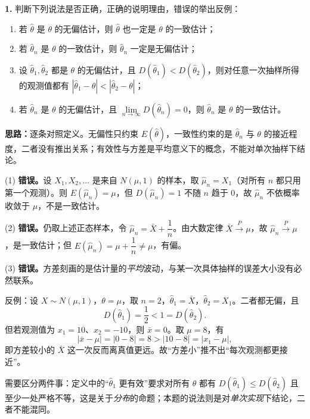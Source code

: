 \textbf{1.} 判断下列说法是否正确，正确的说明理由，错误的举出反例：
\begin{enumerate}[label=(\arabic*)]
    \item 若 $\widehat\theta$ 是 $\theta$ 的无偏估计，则 $\widehat\theta$ 也一定是 $\theta$ 的一致估计；
    \item 若 $\widehat\theta_n$ 是 $\theta$ 的一致估计，则 $\widehat\theta_n$ 一定是无偏估计；
    \item 设 $\widehat\theta_1,\widehat\theta_2$ 都是 $\theta$ 的无偏估计，且 $D(\widehat\theta_1)<D(\widehat\theta_2)$，则对任意一次抽样所得的观测值都有 $|\widehat\theta_1-\theta|<|\widehat\theta_2-\theta|$；
    \item 若 $\widehat\theta_n$ 是 $\theta$ 的无偏估计，且 $\lim\limits_{n\to\infty}D(\widehat\theta_n)=0$，则 $\widehat\theta_n$ 是 $\theta$ 的一致估计。
\end{enumerate}

\ifshowsolutions%
\textbf{思路：}逐条对照定义。无偏性只约束 $E(\widehat\theta)$，一致性约束的是 $\widehat\theta_n$ 与 $\theta$ 的接近程度，二者没有推出关系；有效性与方差是平均意义下的概念，不能对单次抽样下结论。

(1) \textbf{错误。}设 $X_1,X_2,\ldots$ 是来自 $N(\mu,1)$ 的样本，取 $\widehat\mu_n=X_1$（对所有 $n$ 都只用第一个观测）。则 $E(\widehat\mu_n)=\mu$，但 $D(\widehat\mu_n)=1$ 不随 $n$ 趋于 $0$，故 $\widehat\mu_n$ 不依概率收敛于 $\mu$，不是一致估计。

(2) \textbf{错误。}仍取上述正态样本，令 $\widehat\mu_n=\bar X+\dfrac{1}{n}$。由大数定律 $\bar X\xrightarrow{P}\mu$，故 $\widehat\mu_n\xrightarrow{P}\mu$，是一致估计；但 $E(\widehat\mu_n)=\mu+\dfrac{1}{n}\neq\mu$，有偏。

(3) \textbf{错误。}方差刻画的是估计量的\emph{平均}波动，与某一次具体抽样的误差大小没有必然联系。

反例：设 $X\sim N(\mu,1)$，$\theta=\mu$，取 $n=2$，$\widehat\theta_1=\bar X$，$\widehat\theta_2=X_1$。二者都无偏，且
\[
D(\widehat\theta_1)=\frac{1}{2}<1=D(\widehat\theta_2).
\]
但若观测值为 $x_1=10$、$x_2=-10$，则 $\bar x=0$。取 $\mu=8$，有
\[
|\bar x-\mu|=|0-8|=8>|10-8|=|x_1-\mu|,
\]
即方差较小的 $\bar X$ 这一次反而离真值更远。故“方差小”推不出“每次观测都更接近”。

需要区分两件事：定义中的“$\widehat\theta_1$ 更有效”要求对所有 $\theta$ 都有 $D(\widehat\theta_1)\leqslant D(\widehat\theta_2)$ 且至少一处严格不等，这是关于\emph{分布}的命题；本题的说法则是对\emph{单次实现}下结论，二者不能混同。


